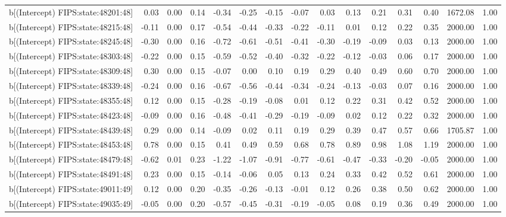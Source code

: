 \begin{table}[ht]
\begin{tabular}{rrrrrrrrrrrrrrr}
  b[(Intercept) FIPS:state:48201:48] & 0.03 & 0.00 & 0.14 & -0.34 & -0.25 & -0.15 & -0.07 & 0.03 & 0.13 & 0.21 & 0.31 & 0.40 & 1672.08 & 1.00 \\ 
  b[(Intercept) FIPS:state:48215:48] & -0.11 & 0.00 & 0.17 & -0.54 & -0.44 & -0.33 & -0.22 & -0.11 & 0.01 & 0.12 & 0.22 & 0.35 & 2000.00 & 1.00 \\ 
  b[(Intercept) FIPS:state:48245:48] & -0.30 & 0.00 & 0.16 & -0.72 & -0.61 & -0.51 & -0.41 & -0.30 & -0.19 & -0.09 & 0.03 & 0.13 & 2000.00 & 1.00 \\ 
  b[(Intercept) FIPS:state:48303:48] & -0.22 & 0.00 & 0.15 & -0.59 & -0.52 & -0.40 & -0.32 & -0.22 & -0.12 & -0.03 & 0.06 & 0.17 & 2000.00 & 1.00 \\ 
  b[(Intercept) FIPS:state:48309:48] & 0.30 & 0.00 & 0.15 & -0.07 & 0.00 & 0.10 & 0.19 & 0.29 & 0.40 & 0.49 & 0.60 & 0.70 & 2000.00 & 1.00 \\ 
  b[(Intercept) FIPS:state:48339:48] & -0.24 & 0.00 & 0.16 & -0.67 & -0.56 & -0.44 & -0.34 & -0.24 & -0.13 & -0.03 & 0.07 & 0.16 & 2000.00 & 1.00 \\ 
  b[(Intercept) FIPS:state:48355:48] & 0.12 & 0.00 & 0.15 & -0.28 & -0.19 & -0.08 & 0.01 & 0.12 & 0.22 & 0.31 & 0.42 & 0.52 & 2000.00 & 1.00 \\ 
  b[(Intercept) FIPS:state:48423:48] & -0.09 & 0.00 & 0.16 & -0.48 & -0.41 & -0.29 & -0.19 & -0.09 & 0.02 & 0.12 & 0.22 & 0.32 & 2000.00 & 1.00 \\ 
  b[(Intercept) FIPS:state:48439:48] & 0.29 & 0.00 & 0.14 & -0.09 & 0.02 & 0.11 & 0.19 & 0.29 & 0.39 & 0.47 & 0.57 & 0.66 & 1705.87 & 1.00 \\ 
  b[(Intercept) FIPS:state:48453:48] & 0.78 & 0.00 & 0.15 & 0.41 & 0.49 & 0.59 & 0.68 & 0.78 & 0.89 & 0.98 & 1.08 & 1.19 & 2000.00 & 1.00 \\ 
  b[(Intercept) FIPS:state:48479:48] & -0.62 & 0.01 & 0.23 & -1.22 & -1.07 & -0.91 & -0.77 & -0.61 & -0.47 & -0.33 & -0.20 & -0.05 & 2000.00 & 1.00 \\ 
  b[(Intercept) FIPS:state:48491:48] & 0.23 & 0.00 & 0.15 & -0.14 & -0.06 & 0.05 & 0.13 & 0.24 & 0.33 & 0.42 & 0.52 & 0.61 & 2000.00 & 1.00 \\ 
  b[(Intercept) FIPS:state:49011:49] & 0.12 & 0.00 & 0.20 & -0.35 & -0.26 & -0.13 & -0.01 & 0.12 & 0.26 & 0.38 & 0.50 & 0.62 & 2000.00 & 1.00 \\ 
  b[(Intercept) FIPS:state:49035:49] & -0.05 & 0.00 & 0.20 & -0.57 & -0.45 & -0.31 & -0.19 & -0.05 & 0.08 & 0.19 & 0.36 & 0.49 & 2000.00 & 1.00 \\ 

\end{tabular}
\end{table}
